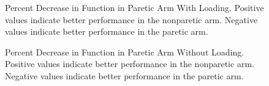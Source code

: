 \documentclass{article}
\begin{document}
\begin{figure}[!ht]
     \centering
     \hfill
	\caption{Percent Decrease in Function in Paretic Arm With Loading. Positive values indicate better performance in the nonparetic arm. Negative values indicate better performance in the paretic arm. }
\end{figure}

\begin{figure}[!ht]
     \centering
     \hfill
	\caption{Percent Decrease in Function in Paretic Arm Without Loading. Positive values indicate better performance in the nonparetic arm. Negative values indicate better performance in the paretic arm.}
\end{figure}
\end{document}
